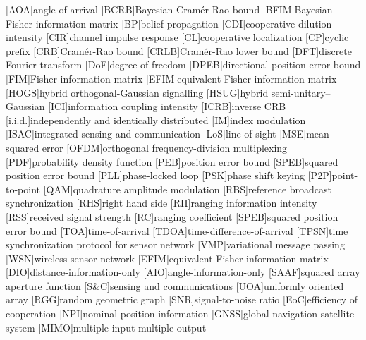 [AOA]{angle-of-arrival}
[BCRB]{Bayesian Cram\'{e}r-Rao bound}
[BFIM]{Bayesian Fisher information matrix}
[BP]{belief propagation}
[CDI]{cooperative dilution intensity}
[CIR]{channel impulse response}
[CL]{cooperative localization}
[CP]{cyclic prefix}
[CRB]{Cram\'{e}r-Rao bound}
[CRLB]{Cram\'{e}r-Rao lower bound}
[DFT]{discrete Fourier transform}
[DoF]{degree of freedom}
[DPEB]{directional position error bound}
[FIM]{Fisher information matrix}
[EFIM]{equivalent Fisher information matrix}
[HOGS]{hybrid orthogonal-Gaussian signalling}
[HSUG]{hybrid semi-unitary--Gaussian}
[ICI]{information coupling intensity}
[ICRB]{inverse CRB}
[i.i.d.]{independently and identically distributed}
[IM]{index modulation}
[ISAC]{integrated sensing and communication}
[LoS]{line-of-sight}
[MSE]{mean-squared error}
[OFDM]{orthogonal frequency-division multiplexing}
[PDF]{probability density function}
[PEB]{position error bound}
[SPEB]{squared position error bound}
[PLL]{phase-locked loop}
[PSK]{phase shift keying}
[P2P]{point-to-point}
[QAM]{quadrature amplitude modulation}
[RBS]{reference broadcast synchronization}
[RHS]{right hand side}
[RII]{ranging information intensity}
[RSS]{received signal strength}
[RC]{ranging coefficient}
[SPEB]{squared position error bound}
[TOA]{time-of-arrival}
[TDOA]{time-difference-of-arrival}
[TPSN]{time synchronization protocol for sensor network}
[VMP]{variational message passing}
[WSN]{wireless sensor network}
[EFIM]{equivalent Fisher information matrix}
[DIO]{distance-information-only}
[AIO]{angle-information-only}
[SAAF]{squared array aperture function}
[S\&C]{sensing and communications}
[UOA]{uniformly oriented array}
[RGG]{random geometric graph}
[SNR]{signal-to-noise ratio}
[EoC]{efficiency of cooperation}
[NPI]{nominal position information}
[GNSS]{global navigation satellite system}
[MIMO]{multiple-input multiple-output}
